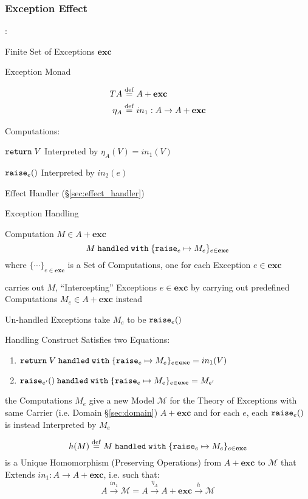 \subsubsection{Exception Effect}\label{sec:exception_effect}

\cite{plotkin-pretnar13}:

Finite Set of Exceptions $\mathbf{exc}$

Exception Monad

\begin{align*}
     T A & \stackrel{\mathrm{def}}= A + \mathbf{exc} \\
  \eta_A & \stackrel{\mathrm{def}}= in_1 : A \rightarrow A + \mathbf{exc}
\end{align*}

Computations:

$\mathtt{return}\; V$ Interpreted by $\eta_A(V) = in_1(V)$

$\mathtt{raise}_e()$ Interpreted by $in_2(e)$

Effect Handler (\S\ref{sec:effect_handler})

Exception Handling

Computation $M \in A + \mathbf{exc}$
\[
  M \;\mathtt{handled\;with}\;
    \{\mathtt{raise}_e \mapsto M_e \}_{e\in\mathbf{exc}}
\]
where $\{\cdots\}_{e\in\mathbf{exc}}$ is a Set of Computations, one
for each Exception $e \in \mathbf{exc}$

carries out $M$, ``Intercepting'' Exceptions $e \in \mathbf{exc}$ by
carrying out predefined Computations $M_e \in A + \mathbf{exc}$
instead

Un-handled Exceptions take $M_e$ to be $\mathtt{raise}_e()$

Handling Construct Satisfies two Equations:
\begin{enumerate}
  \item $\mathtt{return}\; V \;\mathtt{handled\;with}\;
    \{\mathtt{raise}_e \mapsto M_e\}_{e \in \mathbf{exc}}
    = in_1(V)$
  \item $\mathtt{raise}_{e'}() \;\mathtt{handled\;with}\;
    \{\mathtt{raise}_e \mapsto M_e\}_{e \in \mathbf{exc}}
    = M_{e'}$
\end{enumerate}

the Computations $M_e$ give a new Model $\mathcal{M}$ for the Theory
of Exceptions with same Carrier (i.e. Domain \S\ref{sec:domain}) $A +
\mathbf{exc}$ and for each $e$, each $\mathtt{raise}_e ()$ is instead
Interpreted by $M_e$

\[
  h(M) \stackrel{\mathrm{def}}= M \;\mathtt{handled\;with}\;
    \{\mathtt{raise}_e \mapsto M_e\}_{e \in \mathbf{exc}}
\]
is a Unique Homomorphism (Preserving Operations) from $A +
\mathbf{exc}$ to $\mathcal{M}$ that Extends $in_1 : A \rightarrow A +
\mathbf{exc}$, i.e. such that:
\[
  A \xrightarrow{in_1} \mathcal{M} =
    A \xrightarrow{\eta_A} A + \mathbf{exc} \xrightarrow{h} \mathcal{M}
\]

